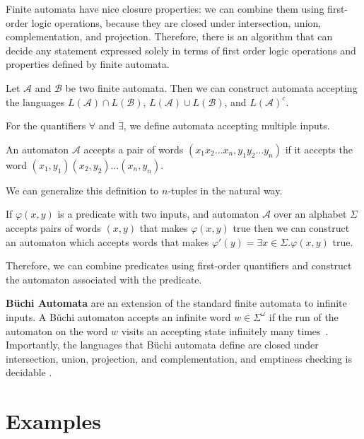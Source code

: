\documentclass[a4paper,usenames,dvipsnames]{article}
\begin{document}
Finite automata have nice closure properties: we can combine them using first-order logic operations, because they are closed under intersection, union, complementation, and projection.
Therefore, there is an algorithm that can decide any statement expressed solely in terms of first order logic operations and properties defined by finite automata.

\begin{theorem}{\cite{aut_theory}}
    Let $\mathcal{A}$ and $\mathcal{B}$ be two finite automata.
    Then we can construct automata accepting the languages $L(\mathcal{A}) \cap L(\mathcal{B})$, $L(\mathcal{A}) \cup L(\mathcal{B})$, and $L(\mathcal{A})^c$.
\end{theorem}

For the quantifiers $\forall$ and $\exists$, we define automata accepting multiple inputs. 
\begin{definition}
    An automaton $\mathcal{A}$ accepts a pair of words $ (x_1x_2\dots x_n, y_1y_2\dots y_n)$ if it accepts the word $(x_1,y_1)(x_2,y_2)\dots(x_n,y_n)$.
\end{definition}

We can generalize this definition to $n$-tuples in the natural way.

\begin{theorem}\cite{aut_theory}
    If $\varphi(x,y)$ is a predicate with two inputs, and automaton $\mathcal{A}$ over an alphabet $\Sigma$ accepts pairs of words $(x, y)$ that makes $\varphi(x, y)$ true then we can construct an automaton which accepts words that makes $\varphi'(y) = \exists x \in \Sigma. \varphi(x,y)$ true.
\end{theorem}

Therefore, we can combine predicates using first-order quantifiers and construct the automaton associated with the predicate.

\textbf{B\"uchi Automata} are an extension of the standard finite automata to infinite inputs.
A B\"uchi automaton accepts an infinite word $w \in \Sigma^\omega$ if the run of the automaton on the word $w$ visits an accepting state infinitely many times~\cite{aut_theory}.
Importantly, the languages that B\"uchi automata define are closed under intersection, union, projection, and complementation, and emptiness checking is decidable \cite{aut_theory}.

\section{Examples}
\end{document}
